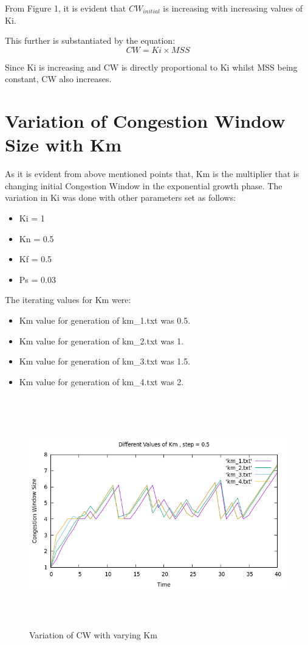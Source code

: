 \documentclass[12pt]{article}
\begin{document}
From Figure 1, it is evident that $CW_{initial}$ is increasing with increasing values of Ki.

This further is substantiated by the equation:
\begin{equation*}
    CW = Ki \times MSS
\end{equation*}

Since Ki is increasing and CW is directly proportional to Ki whilst MSS being constant, CW also increases.

\section{Variation of Congestion Window Size with Km}
As it is evident from above mentioned points that, Km is the multiplier that is changing initial Congestion Window in the exponential growth phase.
The variation in Ki was done with other parameters set as follows:
\begin{itemize}
    \item Ki = 1
    \item Kn = 0.5
    \item Kf = 0.5
    \item Ps = 0.03
\end{itemize}

The iterating values for Km were:
\begin{itemize}
    \item Km value for generation of km\_1.txt was 0.5.
    \item Km value for generation of km\_2.txt was 1.
    \item Km value for generation of km\_3.txt was 1.5.
    \item Km value for generation of km\_4.txt was 2.
\end{itemize}

\begin{figure}
    \centering
    \includegraphics[width=15cm, height=10cm]{km.png}
    \caption{Variation of CW with varying Km}
\end{figure}
\end{document}
